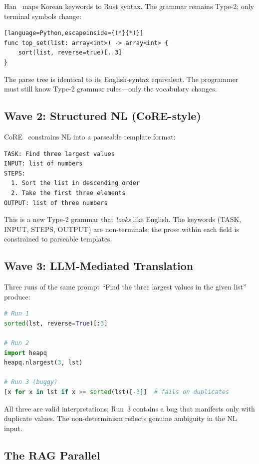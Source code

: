 \documentclass[11pt]{article}
\theoremstyle{definition}
\begin{document}
Han~\cite{han2025} maps Korean keywords to Rust syntax. The grammar remains Type-2; only terminal symbols change:

\begin{lstlisting}[language=Python,escapeinside={(*}{*)}]
func top_set(list: array<int>) -> array<int> {
    sort(list, reverse=true)[..3]
}
\end{lstlisting}

The parse tree is identical to its English-syntax equivalent. The programmer must still know Type-2 grammar rules---only the vocabulary changes.

\subsection{Wave 2: Structured NL (CoRE-style)}

CoRE~\cite{core2025} constrains NL into a parseable template format:

\begin{lstlisting}
TASK: Find three largest values
INPUT: list of numbers
STEPS:
  1. Sort the list in descending order
  2. Take the first three elements
OUTPUT: list of three numbers
\end{lstlisting}

This is a new Type-2 grammar that \emph{looks} like English. The keywords (TASK, INPUT, STEPS, OUTPUT) are non-terminals; the prose within each field is constrained to parseable templates.

\subsection{Wave 3: LLM-Mediated Translation}

Three runs of the same prompt ``Find the three largest values in the given list'' produce:

\begin{lstlisting}[language=Python]
# Run 1
sorted(lst, reverse=True)[:3]

# Run 2
import heapq
heapq.nlargest(3, lst)

# Run 3 (buggy)
[x for x in lst if x >= sorted(lst)[-3]]  # fails on duplicates
\end{lstlisting}

All three are valid interpretations; Run~3 contains a bug that manifests only with duplicate values. The non-determinism reflects genuine ambiguity in the NL input.

\subsection{The RAG Parallel}
\end{document}
